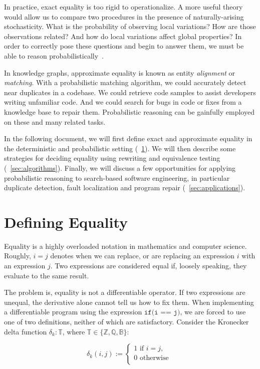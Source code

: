 \documentclass[11pt]{article}
\begin{document}
    In practice, exact equality is too rigid to operationalize. A more useful theory would allow us to compare two procedures in the presence of naturally-arising stochasticity. What is the probability of observing local variations? How are those observations related? And how do local variations affect global properties? In order to correctly pose these questions and begin to answer them, we must be able to reason probabilistically~\citep{pearl2014probabilistic}.

    In knowledge graphs, approximate equality is known as entity \textit{alignment} or \textit{matching}. With a probabilistic matching algorithm, we could accurately detect near duplicates in a codebase. We could retrieve code samples to assist developers writing unfamiliar code. And we could search for bugs in code or fixes from a knowledge base to repair them. Probabilistic reasoning can be gainfully employed on these and many related tasks.

    In the following document, we will first define exact and approximate equality in the deterministic and probabilistic setting (~\ref{sec:definitions}). We will then describe some strategies for deciding equality using rewriting and equivalence testing (~\ref{sec:algorithms}). Finally, we will discuss a few opportunities for applying probabilistic reasoning to search-based software engineering, in particular duplicate detection, fault localization and program repair (~\ref{sec:applications}).

    \section{Defining Equality}\label{sec:definitions}

    Equality is a highly overloaded notation in mathematics and computer science. Roughly, $i = j$ denotes when we can replace, or are replacing an expression $i$ with an expression $j$. Two expressions are considered equal if, loosely speaking, they evaluate to the same result.

    The problem is, equality is not a differentiable operator. If two expressions are unequal, the derivative alone cannot tell us how to fix them. When implementing a differentiable program using the expression $\texttt{if(i == j)}$, we are forced to use one of two definitions, neither of which are satisfactory. Consider the Kronecker delta function $\delta_k: \mathbb{T}$, where $\mathbb{T} \in \{\mathbb{Z, Q, B}\}$:

    $$
    \delta_k(i, j) :=
    \begin{cases}
        1 \text{ if } i = j, \\
        0 \text{ otherwise }\\
    \end{cases}
    $$
\end{document}
